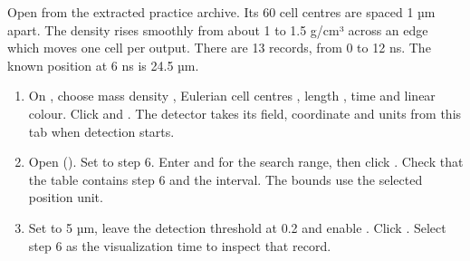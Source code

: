 Open  from the extracted practice archive. Its 60 cell centres are spaced 1 µm apart. The density rises smoothly from about 1 to 1.5 g/cm³ across an edge which moves one cell per output. There are 13 records, from 0 to 12 ns. The known position at 6 ns is 24.5 µm.
\begin{enumerate}
\item On , choose mass density , Eulerian cell centres , length , time  and linear colour. Click  and . The detector takes its field, coordinate and units from this tab when detection starts.
\item Open  (). Set  to step 6. Enter  and  for the search range, then click . Check that the table contains step 6 and the interval. The bounds use the selected position unit.
\item Set  to 5 µm, leave the detection threshold at 0.2 and enable . Click . Select step 6 as the visualization time to inspect that record.
\end{enumerate}

